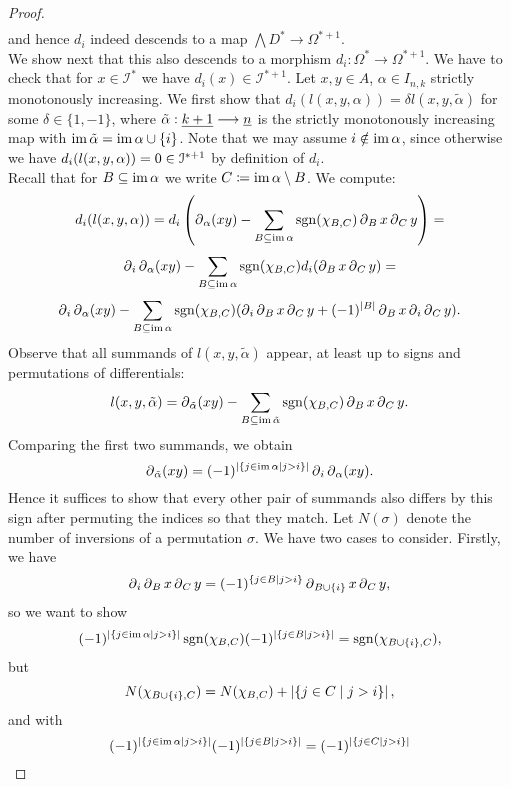 \begin{prop}
\begin{proof}
\begin{gather*}
\end{gather*}
and hence $d_i$ indeed descends to a map $\bigwedge D ^* \to \Omega ^ {*+1}$.
\\
We show next that this also descends to a morphism $d_i: \Omega^* \to \Omega^{*+1}$. We have to check that for $x \in \mathcal{I}^*$ we have $d_i(x) \in \mathcal{I}^{*+1}$. Let $x,y \in A$, $\alpha \in I_{n,k}$ strictly monotonously increasing. We first show that $d_i ( l(x,y,\alpha) ) = \delta l(x,y,\tilde \alpha)$ for some $\delta \in \{1,-1\}$, where $\tilde \alpha: \underline{k+1} \longrightarrow \underline{n}$ is the strictly monotonously increasing map with $\operatorname{im} \tilde \alpha = \operatorname{im} \alpha \cup \{i\}$. Note that we may assume $i \notin \operatorname{im} \alpha$, since otherwise we have $d_i ( l(x,y,\alpha) ) = 0 \in \mathcal{I}^{*+1}$ by definition of $d_i$.\\
Recall that for $B \subseteq \operatorname{im} \alpha$ we write $C \coloneqq \operatorname{im} \alpha \setminus B$. We compute:
    \[ d_i ( l(x,y,\alpha) ) =  d_i \left( \del_\alpha (xy) - \sum\limits_{B \subset%
    \im \alpha} \sgn(\chi_{B,C}) \del_B x \del_C y \right) = \]%
    \[ \del_i \del_\alpha (xy) - \sum\limits_{B \subseteq \im \alpha} \sgn(\chi_{B,C})%
    d_i ( \del_B x \del_C y ) = \]%
    \[ \del_i \del_\alpha (xy) - \sum\limits_{B \subseteq \im \alpha} \sgn(\chi_{B,C})%
    ( \del_i \del_B x \del_C y + (-1)^{\abs{B}} \del_B x \del_i \del_C y ). \]
Observe that all summands of $l(x,y,\tilde \alpha)$ appear, at least up to signs and permutations of differentials:
    \[ l(x,y,\tilde \alpha) = \del_{\tilde \alpha} (xy) - \sum_{B \subseteq \im \tilde \alpha} \sgn (\chi_{B,C})%
    \del_B x \del_C y. \]
Comparing the first two summands, we obtain
    \[ \del_{\tilde \alpha} (xy) = %
    (-1)^{\abs{\{ j \in \im \alpha \with j > i \}} } \del_i\del_\alpha (xy). \]
Hence it suffices to show that every other pair of summands also differs by this sign after permuting the indices so that they match. Let $N(\sigma)$ denote the number of inversions of a permutation $\sigma$. We have two cases to consider. Firstly, we have
    \[ \del_i \del_B x \del_C y = %
    (-1)^{ \{j \in B \with j > i\} } \del_{ B \cup \{i\} } x \del_C y,\]
so we want to show%
    \[ (-1)^{\abs{\{ j \in \im \alpha \with j > i \}} } \sgn(\chi_{B,C}) %
    (-1)^{\abs{\{ j \in B \with j > i \}} } = \sgn(\chi_{B \cup \{i\},C}),\]%
but
    \[ N(\chi_{B \cup \{i\},C}) = N(\chi_{B,C}) + %
    \abs{ \{ j \in C \with j > i\} }, \]%
and with%
    \[(-1)^{\abs{\{ j \in \im \alpha \with j > i \}} }  (-1)^{ \abs{ %
    \{ j \in B \with j > i \} } } = (-1)^{ \abs{ \{j \in C \with j > i\} } }\]%

\end{proof}
\end{prop}

